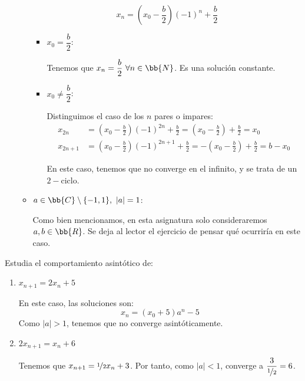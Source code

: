 \begin{itemize}
\begin{itemize}
        \begin{equation*}
            x_n = \left(x_0-\frac{b}{2}\right)(-1)^n + \frac{b}{2}
        \end{equation*}
        \begin{itemize}
            \item $x_0 = \dfrac{b}{2}$:
            
            Tenemos que $x_n=\dfrac{b}{2}~ \forall n\in \bb{N}$. Es una solución constante.

            \item $x_0 \neq \dfrac{b}{2}$:
            
            Distinguimos el caso de los $n$ pares o impares:
            \begin{align*}
                x_{2n} &= \left(x_0-\frac{b}{2}\right)(-1)^{2n} + \frac{b}{2}
                = \left(x_0-\frac{b}{2}\right) + \frac{b}{2} = x_0\\
                x_{2n+1} &= \left(x_0-\frac{b}{2}\right)(-1)^{2n+1} + \frac{b}{2}
                = -\left(x_0-\frac{b}{2}\right) + \frac{b}{2} = b-x_0
            \end{align*}

            En este caso, tenemos que no converge en el infinito, y se trata de un $2-$ciclo.
        \end{itemize}

        \item \ul{$a \in \bb{C} \setminus \{ -1, 1\},~ |a| = 1$}:

        Como bien mencionamos, en esta asignatura solo consideraremos $a,b\in \bb{R}$. Se deja al lector el ejercicio de pensar qué ocurriría en este caso.
    \end{itemize}
\end{itemize}

\begin{ejercicio*}
    Estudia el comportamiento asintótico de:
    \begin{enumerate}
        \item $x_{n+1} = 2x_n + 5$

        En este caso, las soluciones son:
        \begin{equation*}
            x_n = \left(x_0+5\right)a^n -5
        \end{equation*}
        Como $|a|>1$, tenemos que no converge asintóticamente.
        
        \item $2x_{n+1}= x_n + 6$

        Tenemos que $x_{n+1}=\nicefrac{1}{2}x_n + 3$. Por tanto, como $|a|<1$, converge a $\dfrac{3}{\nicefrac{1}{2}}=6$.
    \end{enumerate}
\end{ejercicio*}


